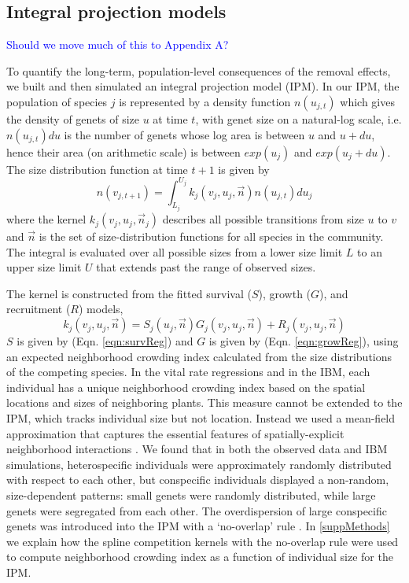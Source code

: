 \documentclass[11pt]{article}
\newcommand{\comment}{\textcolor{blue}}
\begin{document}
\begin{doublespacing}
\subsection*{Integral projection models}

\comment{Should we move much of this to Appendix A?}

To quantify the long-term, population-level consequences of the removal effects, we built and then simulated an integral projection model (IPM). In our IPM, the population of species $j$ is represented by a density function $n(u_{j,t})$ which gives the density of genets of size $u$ at time $t$, with genet size on a natural-log scale, i.e. $n(u_{j,t})du$ is the number of genets whose log area is between $u$ and $u+du$, hence their area 
(on arithmetic scale) is between $exp(u_j)$ and $exp(u_j+du)$. The size distribution function at time $t+1$ is given by
\begin{equation}
n(v_{j,t+1})=\int_{L_j}^{U_j} k_j (v_j,u_j,{\vec{n}})n(u_{j,t})du_j   
\label{eqn:IPM}
\end{equation}
where the kernel $k_j (v_j,u_j,\vec{n}_j)$ describes all possible transitions from size $u$ to $v$ and $\vec{n}$ 
is the set of size-distribution functions for all species in the community. The integral is evaluated over all possible sizes from a 
lower size limit $L$ to an upper size limit $U$ that extends past the range of observed sizes.   

The kernel is constructed from the fitted survival ($S$), growth ($G$), and recruitment ($R$) models, 
\begin{equation}
k_j(v_j,u_j,\vec{n})=S_j(u_j,\vec{n})G_j(v_j,u_j,\vec{n})+R_j(v_j,u_j,\vec{n}) 
\label{eqn:IPM} 
\end{equation}
$S$ is given by (Eqn. \ref{eqn:survReg}) and $G$ is given by (Eqn. \ref{eqn:growReg}), using an expected neighborhood crowding
index calculated from the size distributions of the competing species. In the vital rate regressions and in the IBM, each 
individual has a unique neighborhood crowding index based on the spatial locations and sizes of neighboring plants. This 
measure cannot be extended to the IPM, which tracks individual size but not location. Instead we used a 
mean-field approximation that captures the essential features of spatially-explicit neighborhood interactions \citep{adler_coexistence_2010}. 
We found that in both the observed data and IBM simulations, heterospecific individuals were approximately randomly distributed with respect to each other, but conspecific individuals displayed a non-random, size-dependent patterns: small genets were randomly distributed, while large genets 
were segregated from each other. The overdispersion of large conspecific genets was introduced into the IPM 
with a `no-overlap' rule \citep{adler_coexistence_2010}. In \ref{suppMethods} we explain how the spline competition kernels with the no-overlap rule were used to compute neighborhood crowding index as a function of individual size for the IPM.  


\end{doublespacing}
\end{document}
